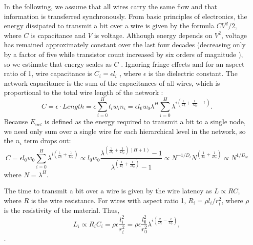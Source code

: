 \documentclass[12pt]{article}
\begin{document}
In the following, 
we assume that all wires carry the same flow and that information is 
transferred synchronously. From basic principles of electronics, the 
energy dissipated to transmit a bit over a wire is given by the 
formula $CV^2/2$, where $C$ is capacitance and $V$ is voltage.  
Although energy depends on $V^2$, voltage has remained approximately 
constant over the last four decades (decreasing only by a factor of 
five while transistor count increased by six orders of magnitude 
\cite{ning07}), so we estimate that energy scales as $C$ 
\cite{bingham08}.  Ignoring fringe effects and for an aspect ratio of 
1, wire capacitance is $C_i = \epsilon l_i$ \cite{wilhelm95}, where 
$\epsilon$ is the dielectric constant.  The network capacitance is the 
sum of the capacitances of all wires, which is proportional to the 
total wire length of the network \cite{donath79}:
\begin{equation}
C = \epsilon\cdot Length = \epsilon \sum_{i=0}^H l_i w_i n_i = 
\epsilon l_0 w_0 \lambda^H \sum_{i=0}^H \lambda^{i \left( 
\frac{1}{D_l} + \frac{1}{D_w} -1 \right)}.
\end{equation}
Because $E_{net}$ is defined as the energy required to transmit a bit to a single node, we need only sum over a single wire for each hierarchical level in the network, so the $n_i$ term drops
out:
\begin{equation}
C = \epsilon l_0 w_0 \sum_{i=0}^H \lambda^{i \left( 
\frac{1}{D_l} + \frac{1}{D_w} \right)} \propto l_0 w_0 \frac{\lambda^{(\frac{1}{D_l} + \frac{1}{D_w}) (H + 1)} - 1}{\lambda^{(\frac{1}{D_l} + \frac{1}{D_w})} - 1} \propto N^{-1/D_l}N^{(\frac{1}{D_l} + \frac{1}{D_w})}\propto N^{1/D_w}
\end{equation}
\noindent where $N = \lambda^H$.


The time to transmit a bit over a wire is given by the wire latency as 
$L \propto RC$, where $R$ is the wire resistance.  For wires with 
aspect ratio 1, $R_i = \rho l_i /r_i^2$, where $\rho$ is the 
resistivity of the material.  Thus,
\begin{equation}
L_i \propto R_i C_i = \rho \epsilon \frac{l_i^2}{r_i^2} = \rho 
\epsilon\frac{ l_0^2}{r_0^2}\lambda^{i\left( \frac{2}{D_l} 
- \frac{2}{D_r}\right)},
\end{equation}.
\end{document}
